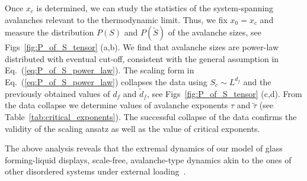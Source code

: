 \documentclass[pre,twocolumn,superscriptaddress,tightenlines,showpacs,longbibliography,floatfix,footinbib]{revtex4-1}
\begin{document}
Once $x_c$ is determined, we can study the statistics of the system-spanning avalanches relevant to the thermodynamic limit. Thus, we fix $x_0=x_c$ and measure the distribution $P(S)$ and $P(\tilde S)$ of the avalanche sizes, see Figs~\ref{fig:P_of_S_tensor} (a,b). 
We find that avalanche sizes are power-law distributed with eventual cut-off,  consistent with the general assumption in Eq.~(\ref{eq:P_of_S_power_law}).
The scaling form in Eq.~(\ref{eq:P_of_S_power_law}) collapses the data using $S_c \sim L^{d_f}$ and the previously obtained values of $d_f$ and $\tilde d_f$, see Figs~\ref{fig:P_of_S_tensor} (c,d). From the data collapse we determine values of avalanche exponents $\tau$ and $\tilde \tau$ (see Table~\ref{tab:critical_exponents}).
The successful collapse of the data confirms the validity of the scaling ansatz as well as the value of critical exponents.


The above analysis reveals that the extremal dynamics of our model of glass forming-liquid displays, scale-free, avalanche-type dynamics akin to the ones of other disordered systems under external loading~\cite{sethna2001crackling,rosso2022avalanches}.
\end{document}
